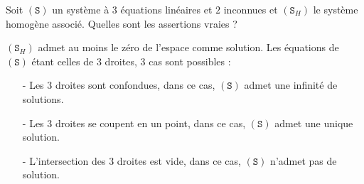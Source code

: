 \begin{question}
Soit $(\mathtt{S})$ un système à $3$ équations linéaires et $2$ inconnues et $(\mathtt{S}_H)$ le système homogène associé. Quelles sont les assertions vraies ?
\begin{answers}  
\end{answers}
\begin{explanations}
$(\mathtt{S}_H)$ admet au moins le zéro de l'espace comme solution. Les équations de $(\mathtt{S})$ étant celles de $3$ droites, $3$ cas sont possibles :
\begin{enumerate}
\item[-] Les $3$ droites sont confondues, dans ce cas, $(\mathtt{S})$ admet une infinité de solutions.
\item[-] Les $3$ droites se coupent en un point, dans ce cas, $(\mathtt{S})$ admet une unique solution.
\item[-] L'intersection des $3$ droites est vide, dans ce cas, $(\mathtt{S})$ n'admet pas de solution.
\end{enumerate}
\end{explanations}
\end{question}


